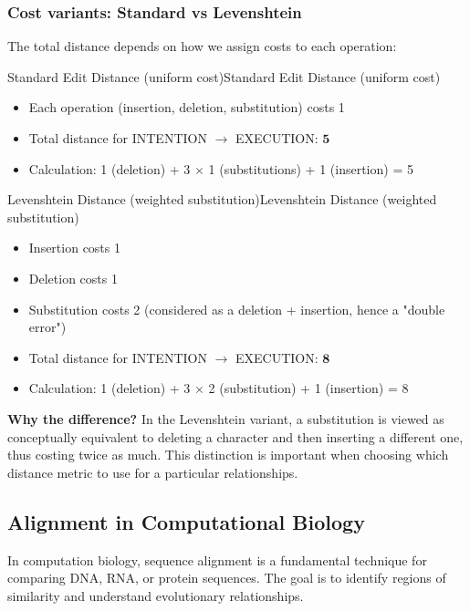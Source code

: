 \documentclass[a4paper]{article}
\theoremstyle{definition}
\begin{document}
\subsubsection{Cost variants: Standard vs Levenshtein}
The total distance depends on how we assign costs to each operation:
\begin{definition}{Standard Edit Distance (uniform cost)}{Standard Edit Distance (uniform cost)}
\begin{itemize}
  \item Each operation (insertion, deletion, substitution) costs 1 
  \item Total distance for INTENTION \( \rightarrow \) EXECUTION: \( \mathbf{5} \)   
  \item Calculation: 1 (deletion) + 3 \( \times \) 1 (substitutions) + 1 (insertion) = 5
\end{itemize}
\end{definition}
\begin{theorem}{Levenshtein Distance (weighted substitution)}{Levenshtein Distance (weighted substitution)}
\begin{itemize}
  \item Insertion costs 1 
  \item Deletion costs 1 
  \item Substitution costs 2 (considered as a deletion + insertion, hence a "double error")
  \item Total distance for INTENTION \( \rightarrow \) EXECUTION: \( \mathbf{8} \)    
  \item Calculation: 1 (deletion) + 3 \( \times \) 2 (substitution) + 1 (insertion) = 8
\end{itemize}
\end{theorem}
\textbf{Why the difference?} In the Levenshtein variant, a substitution is viewed as conceptually 
equivalent to deleting a character and then inserting a different one, thus costing twice as much.
This distinction is important when choosing which distance metric to use for a particular relationships.
\subsection{Alignment in Computational Biology}
In computation biology, sequence alignment is a fundamental technique for comparing DNA, RNA, or protein sequences.
The goal is to identify regions of similarity and understand evolutionary relationships.
\end{document}
